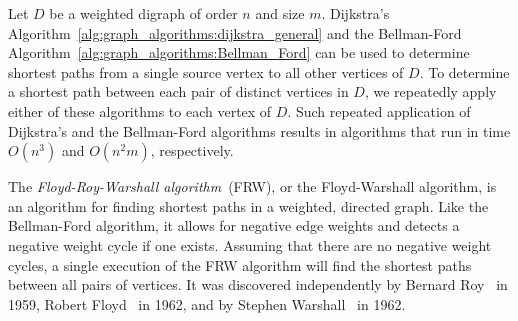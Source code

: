 Let $D$ be a weighted digraph of order $n$ and size $m$. Dijkstra's
Algorithm~\ref{alg:graph_algorithms:dijkstra_general} and the
Bellman-Ford Algorithm~\ref{alg:graph_algorithms:Bellman_Ford} can be
used to determine shortest paths from a single source vertex to all
other vertices of $D$. To determine a shortest path between each pair
of distinct vertices in $D$, we repeatedly apply either of these
algorithms to each vertex of $D$. Such repeated application of
Dijkstra's and the Bellman-Ford algorithms results in algorithms that
run in time $O(n^3)$ and $O(n^2m)$, respectively.

The \emph{Floyd-Roy-Warshall algorithm}~(FRW), or the Floyd-Warshall
algorithm, is an algorithm for finding shortest paths in a weighted,
directed graph. Like the Bellman-Ford algorithm, it allows for
negative edge weights and detects a negative weight cycle if one
exists. Assuming that there are no negative weight cycles, a single
execution of the FRW algorithm will find the shortest paths between
all pairs of vertices. It was discovered independently by Bernard
Roy~\cite{Roy1959} in 1959, Robert Floyd~\cite{Floyd1962} in 1962, and
by Stephen Warshall~\cite{Warshall1962} in 1962.

